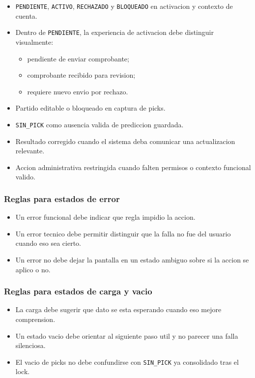 \begin{itemize}
  \item \texttt{PENDIENTE}, \texttt{ACTIVO}, \texttt{RECHAZADO} y \texttt{BLOQUEADO} en activacion y contexto de cuenta.
  \item Dentro de \texttt{PENDIENTE}, la experiencia de activacion debe distinguir visualmente:
  \begin{itemize}
    \item pendiente de enviar comprobante;
    \item comprobante recibido para revision;
    \item requiere nuevo envio por rechazo.
  \end{itemize}
  \item Partido editable o bloqueado en captura de picks.
  \item \texttt{SIN\_PICK} como ausencia valida de prediccion guardada.
  \item Resultado corregido cuando el sistema deba comunicar una actualizacion relevante.
  \item Accion administrativa restringida cuando falten permisos o contexto funcional valido.
\end{itemize}

\subsubsection{Reglas para estados de error}

\begin{itemize}
  \item Un error funcional debe indicar que regla impidio la accion.
  \item Un error tecnico debe permitir distinguir que la falla no fue del usuario cuando eso sea cierto.
  \item Un error no debe dejar la pantalla en un estado ambiguo sobre si la accion se aplico o no.
\end{itemize}

\subsubsection{Reglas para estados de carga y vacio}

\begin{itemize}
  \item La carga debe sugerir que dato se esta esperando cuando eso mejore comprension.
  \item Un estado vacio debe orientar al siguiente paso util y no parecer una falla silenciosa.
  \item El vacio de picks no debe confundirse con \texttt{SIN\_PICK} ya consolidado tras el lock.
\end{itemize}

